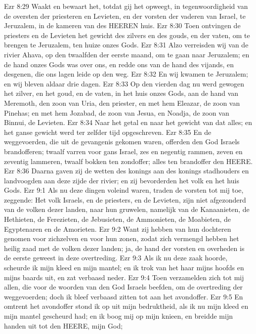 Ezr 8:29  Waakt en bewaart het, totdat gij het opweegt, in tegenwoordigheid van de oversten der priesteren en Levieten, en der vorsten der vaderen van Israel, te Jeruzalem, in de kameren van des HEEREN huis.
Ezr 8:30  Toen ontvingen de priesters en de Levieten het gewicht des zilvers en des gouds, en der vaten, om te brengen te Jeruzalem, ten huize onzes Gods.
Ezr 8:31  Alzo verreisden wij van de rivier Ahava, op den twaalfden der eerste maand, om te gaan naar Jeruzalem; en de hand onzes Gods was over ons, en redde ons van de hand des vijands, en desgenen, die ons lagen leide op den weg.
Ezr 8:32  En wij kwamen te Jeruzalem; en wij bleven aldaar drie dagen.
Ezr 8:33  Op den vierden dag nu werd gewogen het zilver, en het goud, en de vaten, in het huis onzes Gods, aan de hand van Meremoth, den zoon van Uria, den priester, en met hem Eleazar, de zoon van Pinehas; en met hem Jozabad, de zoon van Jesua, en Noadja, de zoon van Binnui, de Levieten.
Ezr 8:34  Naar het getal en naar het gewicht van dat alles; en het ganse gewicht werd ter zelfder tijd opgeschreven.
Ezr 8:35  En de weggevoerden, die uit de gevangenis gekomen waren, offerden den God Israels brandofferen; twaalf varren voor gans Israel, zes en negentig rammen, zeven en zeventig lammeren, twaalf bokken ten zondoffer; alles ten brandoffer den HEERE.
Ezr 8:36  Daarna gaven zij de wetten des konings aan des konings stadhouders en landvoogden aan deze zijde der rivier; en zij bevorderden het volk en het huis Gods.
Ezr 9:1  Als nu deze dingen voleind waren, traden de vorsten tot mij toe, zeggende: Het volk Israels, en de priesters, en de Levieten, zijn niet afgezonderd van de volken dezer landen, naar hun gruwelen, namelijk van de Kanaanieten, de Hethieten, de Ferezieten, de Jebusieten, de Ammonieten, de Moabieten, de Egyptenaren en de Amorieten.
Ezr 9:2  Want zij hebben van hun dochteren genomen voor zichzelven en voor hun zonen, zodat zich vermengd hebben het heilig zaad met de volken dezer landen; ja, de hand der vorsten en overheden is de eerste geweest in deze overtreding.
Ezr 9:3  Als ik nu deze zaak hoorde, scheurde ik mijn kleed en mijn mantel; en ik trok van het haar mijns hoofds en mijns baards uit, en zat verbaasd neder.
Ezr 9:4  Toen verzamelden zich tot mij allen, die voor de woorden van den God Israels beefden, om de overtreding der weggevoerden; doch ik bleef verbaasd zitten tot aan het avondoffer.
Ezr 9:5  En omtrent het avondoffer stond ik op uit mijn bedruktheid, als ik nu mijn kleed en mijn mantel gescheurd had; en ik boog mij op mijn knieen, en breidde mijn handen uit tot den HEERE, mijn God;
